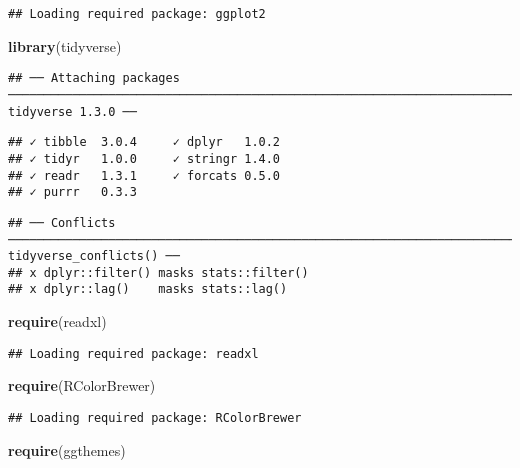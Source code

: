 \documentclass[]{article}
\newenvironment{Shaded}{\begin{snugshade}}{\end{snugshade}}
\newcommand{\KeywordTok}[1]{\textcolor[rgb]{0.13,0.29,0.53}{\textbf{#1}}}
\newcommand{\NormalTok}[1]{#1}
\begin{document}
\begin{verbatim}
## Loading required package: ggplot2
\end{verbatim}

\begin{Shaded}
\begin{Highlighting}[]
\KeywordTok{library}\NormalTok{(tidyverse)}
\end{Highlighting}
\end{Shaded}

\begin{verbatim}
## ── Attaching packages ────────────────────────────────────────────────────────────────────────── tidyverse 1.3.0 ──
\end{verbatim}

\begin{verbatim}
## ✓ tibble  3.0.4     ✓ dplyr   1.0.2
## ✓ tidyr   1.0.0     ✓ stringr 1.4.0
## ✓ readr   1.3.1     ✓ forcats 0.5.0
## ✓ purrr   0.3.3
\end{verbatim}

\begin{verbatim}
## ── Conflicts ───────────────────────────────────────────────────────────────────────────── tidyverse_conflicts() ──
## x dplyr::filter() masks stats::filter()
## x dplyr::lag()    masks stats::lag()
\end{verbatim}

\begin{Shaded}
\begin{Highlighting}[]
\KeywordTok{require}\NormalTok{(readxl)}
\end{Highlighting}
\end{Shaded}

\begin{verbatim}
## Loading required package: readxl
\end{verbatim}

\begin{Shaded}
\begin{Highlighting}[]
\KeywordTok{require}\NormalTok{(RColorBrewer)}
\end{Highlighting}
\end{Shaded}

\begin{verbatim}
## Loading required package: RColorBrewer
\end{verbatim}

\begin{Shaded}
\begin{Highlighting}[]
\KeywordTok{require}\NormalTok{(ggthemes)}
\end{Highlighting}
\end{Shaded}
\end{document}
